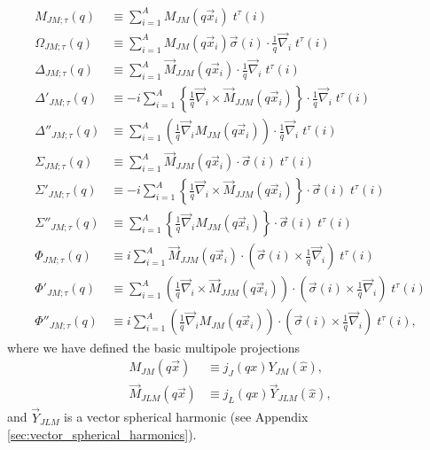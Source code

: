 \documentclass{book}[letterpaper,12pt]
\begin{document}
\begin{equation}
\begin{split}
M_{JM;\tau}(q)&\equiv \sum_{i=1}^AM_{JM}(q\vec{x}_i)\;t^{\tau}(i)\\
\Omega_{JM;\tau}(q)&\equiv \sum_{i=1}^AM_{JM}(q\vec{x}_i)\vec{\sigma}(i)\cdot\frac{1}{q}\vec{\nabla}_i\;t^{\tau}(i)\\
\Delta_{JM;\tau}(q)&\equiv \sum_{i=1}^A \vec{M}_{JJM}(q\vec{x}_i)\cdot\frac{1}{q}\vec{\nabla}_i\;t^{\tau}(i)\\
\Delta'_{JM;\tau}(q)&\equiv -i\sum_{i=1}^A \left\{\frac{1}{q}\vec{\nabla}_i\times\vec{M}_{JJM}(q\vec{x}_i)\right\}\cdot\frac{1}{q}\vec{\nabla}_i\;t^{\tau}(i)\\
\Delta''_{JM;\tau}(q)&\equiv \sum_{i=1}^A\left(\frac{1}{q}\vec{\nabla}_iM_{JM}(q\vec{x}_i)\right)\cdot\frac{1}{q}\vec{\nabla}_i\;t^{\tau}(i)\\
\Sigma_{JM;\tau}(q)&\equiv \sum_{i=1}^A\vec{M}_{JJM}(q\vec{x}_i)\cdot\vec{\sigma}(i)\;t^{\tau}(i)\\
\Sigma'_{JM;\tau}(q)&\equiv -i\sum_{i=1}^A\left\{\frac{1}{q}\vec{\nabla}_i\times\vec{M}_{JJM}(q\vec{x}_i)\right\}\cdot\vec{\sigma}(i)\;t^{\tau}(i)\\
\Sigma''_{JM;\tau}(q)&\equiv \sum_{i=1}^A\left\{\frac{1}{q}\vec{\nabla}_iM_{JM}(q\vec{x}_i)\right\}\cdot\vec{\sigma}(i)\;t^{\tau}(i)\\
\Phi_{JM;\tau}(q)&\equiv i\sum_{i=1}^A\vec{M}_{JJM}(q\vec{x}_i)\cdot\left(\vec{\sigma}(i)\times\frac{1}{q}\vec{\nabla}_i\right)\;t^{\tau}(i)\\
\Phi'_{JM;\tau}(q)&\equiv\sum_{i=1}^A\left(\frac{1}{q}\vec{\nabla}_i\times\vec{M}_{JJM}(q\vec{x}_i)\right)\cdot\left(\vec{\sigma}(i)\times\frac{1}{q}\vec{\nabla}_i\right)\;t^{\tau}(i)\\
\Phi''_{JM;\tau}(q)&\equiv i\sum_{i=1}^A\left(\frac{1}{q}\vec{\nabla}_iM_{JM}(q\vec{x}_i)\right)\cdot\left(\vec{\sigma}(i)\times\frac{1}{q}\vec{\nabla}_i\right)\;t^{\tau}(i),
\label{eq:single_nucleon_responses}
\end{split}
\end{equation}
where we have defined the basic multipole projections
\begin{equation}
\begin{split}
M_{JM}(q\vec{x})&\equiv j_J(qx)Y_{JM}(\hat{x}),\\
\vec{M}_{JLM}(q\vec{x})&\equiv j_L(qx)\vec{Y}_{JLM}(\hat{x}),
\end{split}
\end{equation}
and $\vec{Y}_{JLM}$ is a vector spherical harmonic (see Appendix \ref{sec:vector_spherical_harmonics}). 
\end{document}
